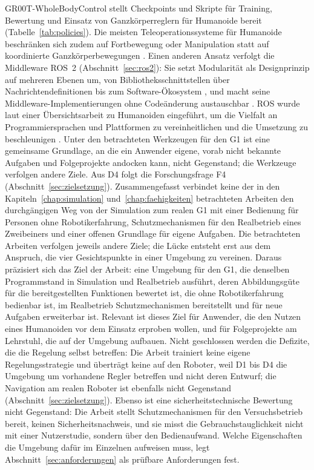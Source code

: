 GR00T-WholeBodyControl stellt Checkpoints und Skripte für Training, Bewertung und Einsatz von Ganzkörperreglern für Humanoide bereit \cite{NvidiaGR00TWBC} (Tabelle~\ref{tab:policies}).
Die meisten Teleoperationssysteme für Humanoide beschränken sich zudem auf Fortbewegung oder Manipulation statt auf koordinierte Ganzkörperbewegungen \cite{Ze2025}.
Einen anderen Ansatz verfolgt die Middleware ROS~2 (Abschnitt~\ref{sec:ros2}): Sie setzt Modularität als Designprinzip auf mehreren Ebenen um, von Bibliotheksschnittstellen über Nachrichtendefinitionen bis zum Software-Ökosystem \cite{Macenski2022}, und macht seine Middleware-Implementierungen ohne Codeänderung austauschbar \cite{Macenski2022}.
ROS wurde laut einer Übersichtsarbeit zu Humanoiden eingeführt, um die Vielfalt an Programmiersprachen und Plattformen zu vereinheitlichen und die Umsetzung zu beschleunigen \cite{Saeedvand2019}.
Unter den betrachteten Werkzeugen für den G1 ist eine gemeinsame Grundlage, an die ein Anwender eigene, vorab nicht bekannte Aufgaben und Folgeprojekte andocken kann, nicht Gegenstand; die Werkzeuge verfolgen andere Ziele.
Aus D4 folgt die Forschungsfrage F4 (Abschnitt~\ref{sec:zielsetzung}).
%
Zusammengefasst verbindet keine der in den Kapiteln~\ref{chap:simulation} und~\ref{chap:faehigkeiten} betrachteten Arbeiten den durchgängigen Weg von der Simulation zum realen G1 mit einer Bedienung für Personen ohne Robotikerfahrung, Schutzmechanismen für den Realbetrieb eines Zweibeiners und einer offenen Grundlage für eigene Aufgaben.
Die betrachteten Arbeiten verfolgen jeweils andere Ziele; die Lücke entsteht erst aus dem Anspruch, die vier Gesichtspunkte in einer Umgebung zu vereinen.
Daraus präzisiert sich das Ziel der Arbeit: eine Umgebung für den G1, die denselben Programmstand in Simulation und Realbetrieb ausführt, deren Abbildungsgüte für die bereitgestellten Funktionen bewertet ist, die ohne Robotikerfahrung bedienbar ist, im Realbetrieb Schutzmechanismen bereitstellt und für neue Aufgaben erweiterbar ist.
Relevant ist dieses Ziel für Anwender, die den Nutzen eines Humanoiden vor dem Einsatz erproben wollen, und für Folgeprojekte am Lehrstuhl, die auf der Umgebung aufbauen.
Nicht geschlossen werden die Defizite, die die Regelung selbst betreffen: Die Arbeit trainiert keine eigene Regelungsstrategie und überträgt keine auf den Roboter, weil D1 bis D4 die Umgebung um vorhandene Regler betreffen und nicht deren Entwurf; die Navigation am realen Roboter ist ebenfalls nicht Gegenstand (Abschnitt~\ref{sec:zielsetzung}).
Ebenso ist eine sicherheitstechnische Bewertung nicht Gegenstand: Die Arbeit stellt Schutzmechanismen für den Versuchsbetrieb bereit, keinen Sicherheitsnachweis, und sie misst die Gebrauchstauglichkeit nicht mit einer Nutzerstudie, sondern über den Bedienaufwand. 
Welche Eigenschaften die Umgebung dafür im Einzelnen aufweisen muss, legt Abschnitt~\ref{sec:anforderungen} als prüfbare Anforderungen fest.
